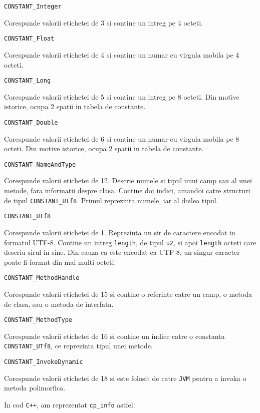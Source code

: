 \documentclass[]{article}
\begin{document}
\texttt{CONSTANT\_Integer}

Corespunde valorii etichetei de 3 si contine un intreg pe 4 octeti.

\texttt{CONSTANT\_Float}

Corespunde valorii etichetei de 4 si contine un numar cu virgula mobila
pe 4 octeti.

\texttt{CONSTANT\_Long}

Corespunde valorii etichetei de 5 si contine un intreg pe 8 octeti. Din
motive istorice, ocupa 2 spatii in tabela de constante.

\texttt{CONSTANT\_Double}

Corespunde valorii etichetei de 6 si contine un numar cu virgula mobila
pe 8 octeti. Din motive istorice, ocupa 2 spatii in tabela de constante.

\texttt{CONSTANT\_NameAndType}

Corespunde valorii etichetei de 12. Descrie numele si tipul unui camp
sau al unei metode, fara informatii despre clasa. Contine doi indici,
amandoi catre structuri de tipul \texttt{CONSTANT\_Utf8}. Primul
reprezinta numele, iar al doilea tipul.

\texttt{CONSTANT\_Utf8}

Corespunde valorii etichetei de 1. Reprezinta un sir de caractere
encodat in formatul UTF-8. Contine un intreg \texttt{length}, de tipul
\texttt{u2}, si apoi \texttt{length} octeti care descriu sirul in sine.
Din cauza ca este encodat ca UTF-8, un singur caracter poate fi format
din mai multi octeti.

\texttt{CONSTANT\_MethodHandle}

Corespunde valorii etichetei de 15 si contine o referinte catre un camp,
o metoda de clasa, sau o metoda de interfata.

\texttt{CONSTANT\_MethodType}

Corespunde valorii etichetei de 16 si contine un indice catre o
constanta \texttt{CONSTANT\_UTf8}, ce reprezinta tipul unei metode.

\texttt{CONSTANT\_InvokeDynamic}

Corespunde valorii etichetei de 18 si este folosit de catre \texttt{JVM}
pentru a invoka o metoda polimorfica.

In cod \texttt{C++}, am reprezentat \texttt{cp\_info} astfel:
\end{document}
